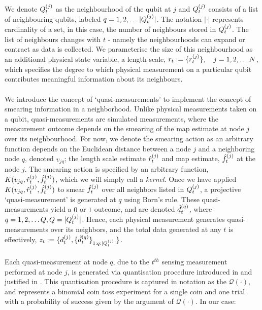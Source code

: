 We denote $Q^{( j )}_{t}$ as the neighbourhood of the qubit at $j$ and $Q^{( j )}_{t}$ consists of a list of neighbouring qubits, labeled $q = 1, 2, \hdots |Q^{( j )}_{t}|$.  The notation $|\cdot|$ represents cardinality of a set, in this case, the number of neighbours stored in $Q^{( j )}_{t}$. The list of neighbours changes with $t$ - namely the neighbourhoods can expand or contract as data is collected. We parameterise the size of this neighbourhood as an additional physical state variable, a length-scale, $r_{ t}:= \{r^{( j )}_{t}\}, \quad  j= 1, 2, \hdots N $, which specifies the degree to which physical measurement on a particular qubit contributes meaningful information about its neighbours. \\
\\
We introduce the concept of `quasi-measurements' to implement the concept of smearing information in a neighborhood. Unlike physical measurements taken on a qubit, quasi-measurements are simulated measurements, where the measurement outcome depends on the smearing of the map estimate at node $j$ over its neighbourhood. For now, we denote the smearing action as an arbitrary function depends on the Euclidean distance between a node $j$ and a neighboring node $q$, denoted $v_{jq}$; the length scale estimate $\hat{r}^{( j )}_{t}$ and map estimate, $\hat{f}^{( j )}_{t}$ at the node $j$. The smearing action is specified by an arbitrary function, $K(v_{jq},\hat{r}^{( j )}_{t}, \hat{f}^{( j )}_{t})$, which we will simply call a \textit{kernel}. Once we have applied $K(v_{jq},\hat{r}^{( j )}_{t}, \hat{f}^{( j )}_{t})$ to smear $\hat{f}^{( j )}_{t}$ over all neighbors listed in $Q^{( j )}_{t}$, a projective `quasi-measurement' is generated at $q$ using Born's rule. These quasi-measurements yield a $0$ or $1$ outcome, and are denoted $\hat{d}^{( q )}_{t}$,  where $q = 1, 2, \hdots Q, Q = |Q^{( j )}_{t}|$. Hence, each physical measurement generates quasi-measurements over its neighbors, and the total data generated at any $t$ is effectively, $z_t := \{d^{( j )}_{t}, \{ \hat{d}^{( q )}_{t} \}_{1:q:|Q^{( j )}_{t}|}\}$.\\
\\
Each quasi-measurement at node $q$, due to the $t^{th}$ sensing measurement performed at node $j$, is generated via quantisation procedure introduced in \cite{riddhi_paper_1} and justified in \cite{riddhi_paper_2}. This quantisation procedure is captured in notation as the $\mathcal{Q}(\cdot)$, and represents a binomial coin toss experiment for a single coin and one trial with a probability of success given by the argument of $\mathcal{Q}(\cdot)$. In our case:
